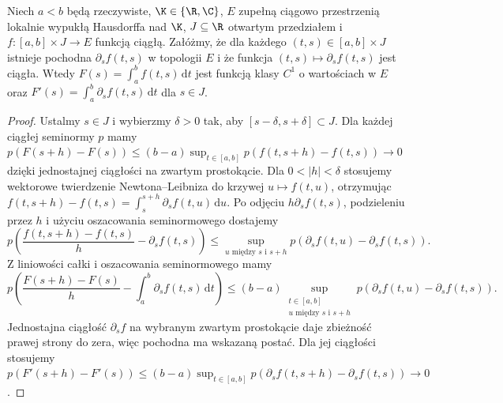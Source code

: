\begin{twierdzenie}
\label{thm:parametric-integral15a}
Niech $a<b$ będą rzeczywiste, $\K\in\{\R,\C\}$,
$E$ zupełną ciągowo przestrzenią lokalnie wypukłą Hausdorffa
nad $\K$, $J\subseteq\R$ otwartym przedziałem i
$f:[a,b]\times J\to E$ funkcją ciągłą. Załóżmy, że dla
każdego $(t,s)\in[a,b]\times J$ istnieje pochodna
$\partial_s f(t,s)$ w topologii $E$ i że funkcja
$(t,s)\mapsto\partial_s f(t,s)$ jest ciągła.
Wtedy $F(s)=\int_a^b f(t,s)\,\mathrm dt$ jest funkcją klasy $C^1$
o wartościach w $E$ oraz
$F'(s)=\int_a^b\partial_s f(t,s)\,\mathrm dt$ dla $s\in J$.
\end{twierdzenie}
\begin{proof}
Ustalmy $s\in J$ i wybierzmy $\delta>0$ tak, aby
$[s-\delta,s+\delta]\subset J$. Dla każdej ciągłej seminormy $p$
mamy $p(F(s+h)-F(s))\le(b-a)\sup_{t\in[a,b]}
p(f(t,s+h)-f(t,s))\to0$ dzięki jednostajnej ciągłości
na zwartym prostokącie. Dla $0<|h|<\delta$ stosujemy
wektorowe twierdzenie Newtona--Leibniza do krzywej
$u\mapsto f(t,u)$, otrzymując
$f(t,s+h)-f(t,s)=\int_s^{s+h}\partial_s f(t,u)\,\mathrm du$.
Po odjęciu $h\partial_s f(t,s)$, podzieleniu przez $h$
i użyciu oszacowania seminormowego dostajemy
\[
 p\left(\frac{f(t,s+h)-f(t,s)}h-\partial_s f(t,s)\right)
 \le\sup_{u\text{ między }s\text{ i }s+h}
 p(\partial_s f(t,u)-\partial_s f(t,s)).
\]
Z liniowości całki i oszacowania seminormowego mamy
\[
 p\left(\frac{F(s+h)-F(s)}h
       -\int_a^b\partial_s f(t,s)\,\mathrm dt\right)
 \le(b-a)\sup_{\substack{t\in[a,b]\\u\text{ między }s\text{ i }s+h}}
 p(\partial_s f(t,u)-\partial_s f(t,s)).
\]
Jednostajna ciągłość $\partial_s f$ na wybranym zwartym
prostokącie daje zbieżność prawej strony do zera, więc
pochodna ma wskazaną postać. Dla jej ciągłości stosujemy
$p(F'(s+h)-F'(s))\le(b-a)\sup_{t\in[a,b]}
p(\partial_s f(t,s+h)-\partial_s f(t,s))\to0$.
\end{proof}


